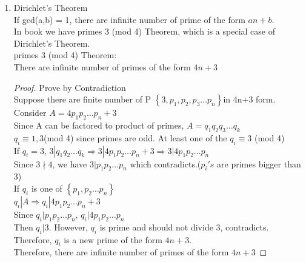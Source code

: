 \documentclass[10pt]{article}
\begin{document}
\begin{multicols}{2}
\begin{enumerate}
\begin{enumerate}
		Then $ax_0 \equiv c$(mod m). We want to find all x.\\
		Then $ax_0 = ax$ (mod m)\\
		$m | a(x-x_0)\Rightarrow \frac{m}{gcd(m,a)}|\frac{a}{gcd(m,a)}(x-x_0)$\\
		$gcd(\frac{m}{gcd(m,a)},\frac{a}{gcd(m,a)}) = 1\Rightarrow \frac{m}{gcd(m,a)}|x-x_0$\\
		$\Rightarrow x = x_0 + k\frac{m}{gcd(m,a)}$
		\item $x \equiv b$ (mod m), $x \equiv c$ (mod n), gcd(m,n) = 1\\
		Use Chinese Remainder Theorm's proof
	\end{enumerate}
	
	\item Dirichlet's Theorem\\
	If gcd(a,b) = 1, there are infinite number of prime of the form $an+b$.\\
	In book we have primes 3 (mod 4) Theorem, which is a special case of Dirichlet's Theorem.\\
	primes 3 (mod 4) Theorem:\\ There are infinite number of primes of the form $4n+3$
	\begin{proof}
		Prove by Contradiction\\
		Suppose there are finite number of P $\left\{3, p_1, p_2, p_3 ... p_n\right\}$in 4n+3 form.\\
		Consider $A = 4p_1p_2 \dots p_n + 3$\\
		Since A can be factored to product of primes, $A = q_1q_2q_3\dots q_k$\\
		$q_i \equiv 1,3$(mod 4) since primes are odd. At least one of the $q_i \equiv 3$ (mod 4)\\
		If $q_i = 3$, $3| q_1q_2\dots q_k \Rightarrow 3|4p_1p_2\dots p_n + 3 \Rightarrow 3|4p_1p_2\dots p_n $ \\
		Since $3 \nmid 4$, we have $3|p_1p_2 \dots p_n$ which contradicts.($p_i's$ are primes bigger than 3)\\
		If $q_i$ is one of $\left\{p_1,p_2\dots p_n\right\}$\\
		$q_i | A\Rightarrow q_i|4p_1p_2 \dots p_n + 3$\\
		Since $q_i | p_1p_2\dots p_n$, $q_i | 4p_1p_2 \dots p_n$\\
		Then $q_i | 3$. However, $q_i$ is prime and should not divide 3, contradicts.\\
		Therefore, $q_i$ is a new prime of the form $4n+3$.\\
		Therefore, there are infinite number of primes of the form $4n+3$
	\end{proof}


\end{enumerate}
\end{multicols}
\end{document}
